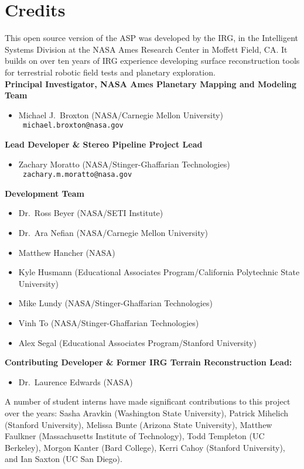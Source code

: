 
\chapter*{Credits}

This open source version of the \ac{ASP} was developed by the
\ac{IRG}, in the Intelligent Systems Division at the \ac{NASA} Ames
Research Center in Moffett Field, CA. It builds on over ten years
of IRG experience developing surface reconstruction tools for
terrestrial robotic field tests and planetary exploration. \\

{\bf Principal Investigator, NASA Ames Planetary Mapping and Modeling Team}
\begin {itemize}
\item Michael J.~Broxton (NASA/Carnegie Mellon University)\\ {\tt
  michael.broxton@nasa.gov}\\
\end{itemize}

{\bf Lead Developer \& Stereo Pipeline Project Lead}
\begin {itemize}
\item Zachary Moratto (NASA/Stinger-Ghaffarian Technologies)\\ {\tt
  zachary.m.moratto@nasa.gov}
\end{itemize}

{\bf Development Team}
\begin{itemize}
\item Dr.~Ross Beyer (NASA/SETI Institute)
\item Dr.~Ara Nefian (NASA/Carnegie Mellon University)
\item Matthew Hancher (NASA)
\item Kyle Husmann (Educational Associates Program/California Polytechnic State University)
\item Mike Lundy (NASA/Stinger-Ghaffarian Technologies)
\item Vinh To (NASA/Stinger-Ghaffarian Technologies)
\item Alex Segal (Educational Associates Program/Stanford University)
\end{itemize}

{\bf Contributing Developer \& Former IRG Terrain Reconstruction Lead:}
\begin{itemize}
\item Dr.\ Laurence Edwards (NASA)
\end{itemize}

A number of student interns have made significant contributions to
this project over the years: Sasha Aravkin (Washington State
University), Patrick
Mihelich (Stanford University), Melissa Bunte (Arizona State
University), Matthew Faulkner (Massachusetts Institute of Technology),
Todd Templeton (UC Berkeley), Morgon Kanter (Bard College), Kerri
Cahoy (Stanford University), and Ian Saxton (UC San Diego).

